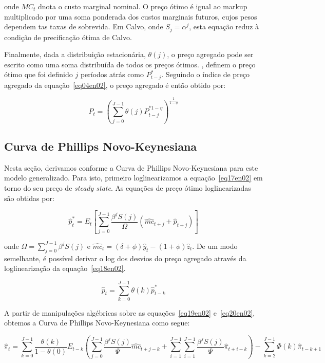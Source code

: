 \documentclass[twoside,a4paper,11pt]{report}
\begin{document}
\noindent onde ${MC}_{t}$ dnota o custo marginal nominal. O preço ótimo é igual ao markup multiplicado por uma soma ponderada dos custos marginais futuros, cujos pesos dependem tas taxas de sobrevida. Em Calvo, onde $S_{j}={\alpha}^{j}$, esta equação reduz à condição de precificação ótima de Calvo.

Finalmente, dada a distribuição estacionária, ${\theta}(j)$, o preço agregado pode ser escrito como uma soma distribuída de todos os preços ótimos. \citet{yao2010aggregate}, definem o preço ótimo que foi definido $j$ períodos atrás como $P_{t-j}^{*}$. Seguindo o índice de preço agregado da equação~\ref{eq04en02}, o preço agregado é então obtido por:

\begin{equation}\label{eq18en02}
{P}_{t}={(\sum_{j=0}^{J-1}{\theta(j){P}_{t-j}^{*1-\eta}})}^{\frac{1}{1-\eta}}
\end{equation}

\subsection*{Curva de Phillips Novo-Keynesiana}

Nesta seção, derivamos conforme \citet{yao2010aggregate} a Curva de Phillips Novo-Keynesiana para este modelo generalizado. Para isto, primeiro loglinearizamos a equação~\ref{eq17en02} em torno do seu preço de \emph{steady state}. As equações de preço ótimo loglinearizadas são obtidas por:

\begin{equation}\label{eq19en02}
{\hat{p}}_{t}^{*}={E}_{t}[\sum_{j=0}^{J-1}{\frac{{\beta}^{j}S(j)}{\Omega}}({\hat{mc}}_{t+j}+{\hat{p}}_{t+j})] 
\end{equation}

\noindent onde $\Omega=\sum_{j=0}^{J-1}{{\beta}^{j}S(j)}$ e ${\hat{mc}}_{t}=(\delta +\phi){\hat{y}}_{t}-(1+\phi){\hat{z}}_{t}$. De um modo semelhante, é possível derivar o log dos desvios do preço agregado através da loglinearização da equação~\ref{eq18en02}.

\begin{equation}\label{eq20en02}
{\hat{p}}_{t}=\sum_{k=0}^{J-1}{\theta(k){\hat{p}}_{t-k}^{*}} 
\end{equation}

A partir de manipulações algébricas sobre as equações~\ref{eq19en02} e~\ref{eq20en02}, obtemos a Curva de Phillips Novo-Keynesiana como segue:

\begin{equation}\label{eq21en02}
{\hat{\pi}}_{t}=\sum_{k=0}^{J-1}{\frac{\theta(k)}{1-\theta(0)}{E}_{t-k}(\sum_{j=0}^{J-1}{\frac{{\beta}^{j}S(j)}{\Psi}{\hat{mc}}_{t+j-k}+\sum_{i=1}^{J-1}{\sum_{i=1}^{J-1}{\frac{{\beta}^{j}S(j)}{\Psi}}}{\hat{\pi}}_{t+i-k}})-\sum_{k=2}^{J-1}{\Phi(k){\hat{\pi}}_{t-k+1}}} 
\end{equation}
\end{document}
